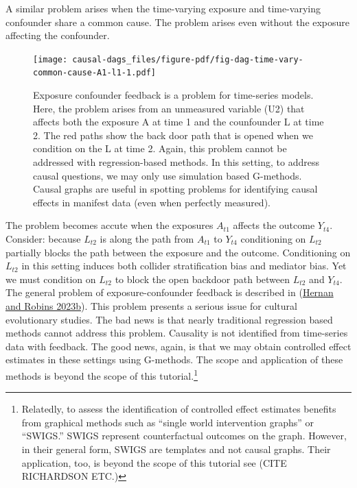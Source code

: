 \documentclass[
  singlecolumn]{report}
\begin{document}
A similar problem arises when the time-varying exposure and time-varying
confounder share a common cause. The problem arises even without the
exposure affecting the confounder.

\begin{figure}

{\centering \texttt{[image: causal-dags\_files/figure-pdf/fig-dag-time-vary-common-cause-A1-l1-1.pdf]}

}

\caption{\label{fig-dag-time-vary-common-cause-A1-l1}Exposure confounder
feedback is a problem for time-series models. Here, the problem arises
from an unmeasured variable (U2) that affects both the exposure A at
time 1 and the counfounder L at time 2. The red paths show the back door
path that is opened when we condition on the L at time 2. Again, this
problem cannot be addressed with regression-based methods. In this
setting, to address causal questions, we may only use simulation based
G-methods. Causal graphs are useful in spotting problems for identifying
causal effects in manifest data (even when perfectly measured).}

\end{figure}

The problem becomes accute when the exposures \(A_{t1}\) affects the
outcome \(Y_{t4}\). Consider: because \(L_{t2}\) is along the path from
\(A_{t1}\) to \(Y_{t4}\) conditioning on \(L_{t2}\) partially blocks the
path between the exposure and the outcome. Conditioning on \(L_{t2}\) in
this setting induces both collider stratification bias and mediator
bias. Yet we must condition on \(L_{t2}\) to block the open backdoor
path between \(L_{t2}\) and \(Y_{t4}\). The general problem of
exposure-confounder feedback is described in
(\protect\hyperlink{ref-hernan2023b}{Hernan and Robins 2023b}). This
problem presents a serious issue for cultural evolutionary studies. The
bad news is that nearly traditional regression based methods cannot
address this problem. Causality is not identified from time-series data
with feedback. The good news, again, is that we may obtain controlled
effect estimates in these settings using G-methods. The scope and
application of these methods is beyond the scope of this
tutorial.\footnote{Relatedly, to assess the identification of controlled
  effect estimates benefits from graphical methods such as ``single
  world intervention graphs'' or ``SWIGS.'' SWIGS represent
  counterfactual outcomes on the graph. However, in their general form,
  SWIGS are templates and not causal graphs. Their application, too, is
  beyond the scope of this tutorial see (CITE RICHARDSON ETC.)}
\end{document}
